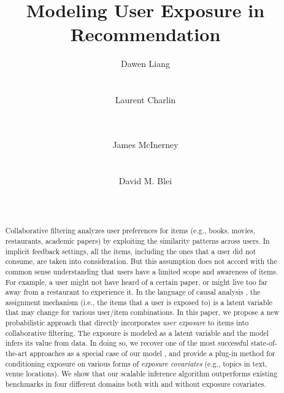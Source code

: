 \documentclass{sig-alternate-arxiv}
\begin{document}

\title{Modeling User Exposure in Recommendation}

 \author{
\alignauthor
Dawen Liang\\
              \\
       \\
\alignauthor
Laurent Charlin\\%
             \\
       \\
\and
\alignauthor
James McInerney\\
       \\
       \\
\alignauthor 
David M. Blei\\
       \\
       \\
}

\maketitle
\begin{abstract}
Collaborative filtering analyzes user preferences for items (e.g., books,
movies, restaurants, academic papers) by exploiting the similarity patterns
across users. In implicit feedback settings, all the items, including the ones 
that a user did not consume, are taken into consideration. But this
assumption does not accord with the common sense understanding that users have
a limited scope and awareness of items. For example, a user might not have
heard of a certain paper, or might live too far away from a restaurant to
experience it. In the language of causal analysis \cite{imbens2015causal}, the
assignment mechanism (i.e., the items that a user is exposed to) is a latent
variable that may change for various user/item combinations. 
In this paper, we propose a new probabilistic approach that directly
incorporates \emph{user exposure} to items into collaborative filtering.
The exposure is modeled as a latent variable and the model infers its
value from data. In doing so, we recover one of the most successful
state-of-the-art approaches as a special case of our model
\cite{hu2008collaborative}, and provide a plug-in method for conditioning
exposure on various forms of \emph{exposure covariates} (e.g., topics in text,
venue locations). We show that our scalable inference algorithm
outperforms existing benchmarks in four different domains both with and
without exposure covariates.

\end{abstract}
\end{document}
